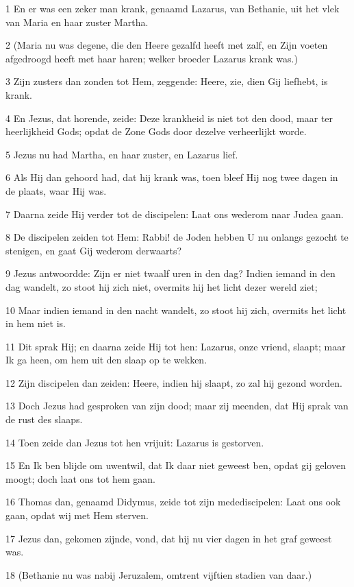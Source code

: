 \par 1 En er was een zeker man krank, genaamd Lazarus, van Bethanie, uit het vlek van Maria en haar zuster Martha.
\par 2 (Maria nu was degene, die den Heere gezalfd heeft met zalf, en Zijn voeten afgedroogd heeft met haar haren; welker broeder Lazarus krank was.)
\par 3 Zijn zusters dan zonden tot Hem, zeggende: Heere, zie, dien Gij liefhebt, is krank.
\par 4 En Jezus, dat horende, zeide: Deze krankheid is niet tot den dood, maar ter heerlijkheid Gods; opdat de Zone Gods door dezelve verheerlijkt worde.
\par 5 Jezus nu had Martha, en haar zuster, en Lazarus lief.
\par 6 Als Hij dan gehoord had, dat hij krank was, toen bleef Hij nog twee dagen in de plaats, waar Hij was.
\par 7 Daarna zeide Hij verder tot de discipelen: Laat ons wederom naar Judea gaan.
\par 8 De discipelen zeiden tot Hem: Rabbi! de Joden hebben U nu onlangs gezocht te stenigen, en gaat Gij wederom derwaarts?
\par 9 Jezus antwoordde: Zijn er niet twaalf uren in den dag? Indien iemand in den dag wandelt, zo stoot hij zich niet, overmits hij het licht dezer wereld ziet;
\par 10 Maar indien iemand in den nacht wandelt, zo stoot hij zich, overmits het licht in hem niet is.
\par 11 Dit sprak Hij; en daarna zeide Hij tot hen: Lazarus, onze vriend, slaapt; maar Ik ga heen, om hem uit den slaap op te wekken.
\par 12 Zijn discipelen dan zeiden: Heere, indien hij slaapt, zo zal hij gezond worden.
\par 13 Doch Jezus had gesproken van zijn dood; maar zij meenden, dat Hij sprak van de rust des slaaps.
\par 14 Toen zeide dan Jezus tot hen vrijuit: Lazarus is gestorven.
\par 15 En Ik ben blijde om uwentwil, dat Ik daar niet geweest ben, opdat gij geloven moogt; doch laat ons tot hem gaan.
\par 16 Thomas dan, genaamd Didymus, zeide tot zijn medediscipelen: Laat ons ook gaan, opdat wij met Hem sterven.
\par 17 Jezus dan, gekomen zijnde, vond, dat hij nu vier dagen in het graf geweest was.
\par 18 (Bethanie nu was nabij Jeruzalem, omtrent vijftien stadien van daar.)
